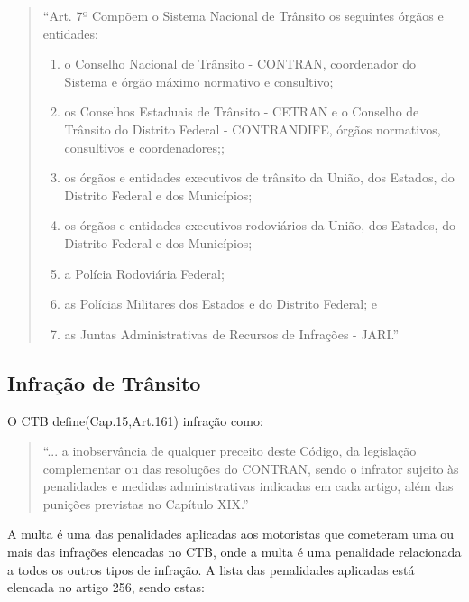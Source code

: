         \begin{quote}
            ``Art. 7º Compõem o Sistema Nacional de Trânsito os seguintes órgãos e entidades:

            \renewcommand{\theenumi}{\Roman{enumi}}%
                \begin{enumerate}
                    \item o Conselho Nacional de Trânsito - CONTRAN, coordenador do Sistema e órgão máximo normativo e consultivo;
                    \item os Conselhos Estaduais de Trânsito - CETRAN e o Conselho de Trânsito do Distrito Federal - CONTRANDIFE, órgãos normativos, consultivos e coordenadores;;
                    \item os órgãos e entidades executivos de trânsito da União, dos Estados, do Distrito Federal e dos Municípios;
                    \item os órgãos e entidades executivos rodoviários da União, dos Estados, do Distrito Federal e dos Municípios;
                    \item a Polícia Rodoviária Federal;
                    \item as Polícias Militares dos Estados e do Distrito Federal; e
                    \item as Juntas Administrativas de Recursos de Infrações - JARI.''
                 \end{enumerate}
         \end{quote}


\subsection{Infração de Trânsito}

    O CTB define(Cap.15,Art.161) infração como: 
    
         \begin{quote}
            ``{...} a inobservância de qualquer preceito deste Código, da legislação complementar ou das resoluções do CONTRAN, sendo o infrator sujeito às penalidades e medidas administrativas indicadas em cada artigo, além das punições previstas no Capítulo XIX.''
         \end{quote}
         
    A multa é uma das penalidades aplicadas aos motoristas que cometeram uma ou mais das infrações elencadas no CTB, onde a multa é uma penalidade relacionada a todos os outros tipos de infração. A lista das penalidades aplicadas está elencada no artigo 256, sendo estas:
    
